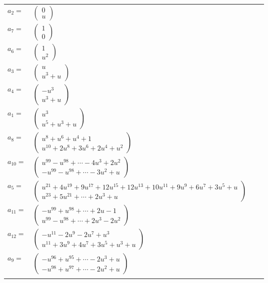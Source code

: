 \documentclass[1p]{elsarticle_modified}
\theoremstyle{definition}
\begin{document}
\begin{tabular}{m{7pt} m{180pt} m{7pt} m{180pt} }
\flushright $a_{2}=$&$\begin{pmatrix}0\\u\end{pmatrix}$ \\
\flushright $a_{7}=$&$\begin{pmatrix}1\\0\end{pmatrix}$ \\
\flushright $a_{6}=$&$\begin{pmatrix}1\\u^2\end{pmatrix}$ \\
\flushright $a_{3}=$&$\begin{pmatrix}u\\u^3+u\end{pmatrix}$ \\
\flushright $a_{4}=$&$\begin{pmatrix}- u^3\\u^3+u\end{pmatrix}$ \\
\flushright $a_{1}=$&$\begin{pmatrix}u^3\\u^5+u^3+u\end{pmatrix}$ \\
\flushright $a_{8}=$&$\begin{pmatrix}u^8+u^6+u^4+1\\u^{10}+2 u^8+3 u^6+2 u^4+u^2\end{pmatrix}$ \\
\flushright $a_{10}=$&$\begin{pmatrix}u^{99}- u^{98}+\cdots-4 u^3+2 u^2\\- u^{99}- u^{98}+\cdots-3 u^2+u\end{pmatrix}$ \\
\flushright $a_{5}=$&$\begin{pmatrix}u^{21}+4 u^{19}+9 u^{17}+12 u^{15}+12 u^{13}+10 u^{11}+9 u^9+6 u^7+3 u^5+u\\u^{23}+5 u^{21}+\cdots+2 u^3+u\end{pmatrix}$ \\
\flushright $a_{11}=$&$\begin{pmatrix}- u^{99}+u^{98}+\cdots+2 u-1\\u^{99}- u^{98}+\cdots+2 u^3-2 u^2\end{pmatrix}$ \\
\flushright $a_{12}=$&$\begin{pmatrix}- u^{11}-2 u^9-2 u^7+u^3\\u^{11}+3 u^9+4 u^7+3 u^5+u^3+u\end{pmatrix}$ \\
\flushright $a_{9}=$&$\begin{pmatrix}- u^{96}+u^{95}+\cdots-2 u^3+u\\- u^{98}+u^{97}+\cdots-2 u^2+u\end{pmatrix}$\\&\end{tabular}
\end{document}
